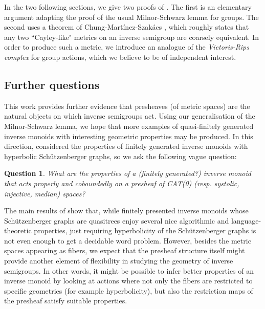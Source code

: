 \documentclass[svgnames]{amsart}
\theoremstyle{plain}
\newtheorem{questintro}[thmintro]{Question}
\theoremstyle{definition}
\begin{document}
In the two following sections, we give two proofs of . The first is
an elementary argument adapting the proof of the usual Milnor-Schwarz lemma for groups. 
The second uses a theorem of Chung-Martínez-Szakács \cite{Chung_Martinez_szakacs}, which roughly states that any two ``Cayley-like" metrics on an inverse semigroup are coarsely equivalent. In order to produce such a metric, we introduce an analogue of the \emph{Vietoris-Rips complex} for group actions, which we believe to be of independent interest. 



\subsection*{Further questions}
This work provides further evidence that presheaves (of metric spaces) are the natural objects on which inverse semigroups act. 
Using our generalisation of the Milnor-Schwarz lemma, we hope that more examples of quasi-finitely generated 
inverse monoids with interesting geometric properties may be produced. In this direction, \cite{gray2022algorithmic} considered the properties of finitely generated inverse monoids with hyperbolic Sch\"{u}tzenberger graphs, so we ask the following vague question:

\begin{questintro}
What are the properties of a (finitely generated?) inverse monoid that acts properly and coboundedly on a presheaf of CAT(0) (resp. 
systolic, injective, median) spaces?
\end{questintro}

\noindent The main results of \cite{gray2022algorithmic} show that, while finitely presented inverse monoids whose Sch\"{u}tzenberger graphs are quasitrees enjoy several nice algorithmic and language-theoretic properties, just requiring hyperbolicity of the Sch\"{u}tzenberger graphs is not even enough to get a decidable word problem. However, besides the metric spaces appearing as fibers, we expect that the presheaf structure itself might provide another element of flexibility in studying the geometry of inverse semigroups. In other words, it might be possible to infer better properties of an inverse monoid by looking at actions where not only the fibers are restricted to specific geometries (for example hyperbolicity), but also the restriction maps of the presheaf satisfy suitable properties.
\end{document}
